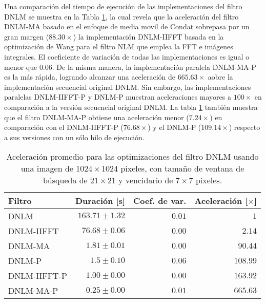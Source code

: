 Una comparación del tiempo de ejecución de las implementaciones del filtro DNLM se muestra en la Tabla \ref{tabla:speedup}, la cual revela que la aceleración del filtro DNLM-MA basado en el enfoque de media movil de Condat \cite{Condat2010} sobrepasa por un gran margen ($88.30\times$) la implementación DNLM-IIFFT \cite{CalderonRamirez2017} basada en la optimización de Wang para el filtro NLM \cite{wang2006fast} que emplea la FFT e imágenes integrales. El coeficiente de variación de todas las implementaciones es igual o menor que $0.06$. 
De la misma manera, la implementación paralela DNLM-MA-P es la más rápida, logrando alcanzar una aceleración de $665.63\times$ aobre la implementación secuencial original DNLM. Sin embargo, las implementaciones paralelas DNLM-IIFFT-P y DNLM-P muestran aceleraciones mayores a $100\times$ en comparación a la versión secuencial original DNLM.
La tabla \ref{tabla:speedup} también muestra que el filtro DNLM-MA-P obtiene una aceleración menor ($7.24\times$) en comparación con el DNLM-IIFFT-P ($76.68\times$) y el DNLM-P ($109.14\times$) respecto a sus versiones con un sólo hilo de ejecución.



\begin{table}
\protect\caption[Aceleración promedio de optimizaciones del filtro DNLM]{Aceleración promedio para las optimizaciones del filtro DNLM usando una imagen de  $1024 \times 1024$ pixeles, con tama\~no de ventana de búsqueda de $21 \times 21$ y vencidario de $7 \times 7$ pixeles. \label{tabla:speedup}}
\centering
\begin{tabular}{lrrr}
Filtro & Duración [s]& Coef. de var. & Aceleración [$\times$]\tabularnewline
\hline
DNLM & $163.71\pm1.32$ & $0.01$ & $1$\tabularnewline
DNLM-IIFFT & $76.68\pm0.06$ & $0.00$ & $2.14$\tabularnewline
DNLM-MA & $1.81\pm 0.01$ & $0.00$ & $90.44$ \tabularnewline
DNLM-P & $1.5\pm0.10$ & $0.06$ & $108.99$\tabularnewline
DNLM-IIFFT-P & $1.00\pm0.00$ & $0.00$ & $163.92$ \tabularnewline 
DNLM-MA-P & $\boldsymbol{0.25\pm0.00}$ & $\boldsymbol{0.01}$ &  $\boldsymbol{665.63}$\tabularnewline
\end{tabular}
\end{table}


